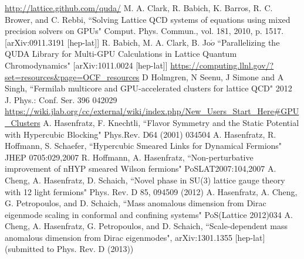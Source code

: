 \documentclass[11pt]{article}
\begin{document}
%
\begin{thebibliography}{99}
\url{http://lattice.github.com/quda/}
M. A. Clark, R. Babich, K. Barros, R. C. Brower, and C. Rebbi,
``Solving Lattice QCD systems of equations using mixed precision solvers on GPUs" Comput. Phys. Commun., vol. 181, 2010, p. 1517. [arXiv:0911.3191 
[hep-lat]]
R. Babich, M. A. Clark, B. Jo$\acute{o}$ ``Parallelizing the QUDA Library for Multi-GPU Calculations in Lattice Quantum Chromodynamics" [arXiv:1011.0024 
[hep-lat]]
\url{https://computing.llnl.gov/?set=resources&page=OCF_resources}
D Holmgren, N Seenu, J Simone and A Singh, ``Fermilab multicore and GPU-accelerated clusters for lattice QCD" 2012 J. Phys.: Conf. Ser. 396 042029
\url{https://wiki.jlab.org/cc/external/wiki/index.php/New_Users_Start_Here#GPU_Clusters}
A. Hasenfratz, F. Knechtli, ``Flavor Symmetry and the Static Potential with Hypercubic Blocking" Phys.Rev. D64 (2001) 034504
A. Hasenfratz, R. Hoffmann, S. Schaefer, ``Hypercubic Smeared Links for Dynamical Fermions" JHEP 0705:029,2007
R. Hoffmann, A. Hasenfratz, ``Non-perturbative improvement of nHYP smeared Wilson fermions" PoSLAT2007:104,2007
A. Cheng, A. Hasenfratz, D. Schaich, ``Novel phase in SU(3) lattice gauge theory with 12 light fermions" Phys. Rev. D 85, 094509 (2012) 
A. Hasenfratz, A. Cheng, G. Petropoulos, and D. Schaich, ``Mass anomalous dimension from Dirac eigenmode scaling in conformal and confining systems" PoS(Lattice 2012)034
A. Cheng, A. Hasenfratz, G. Petropoulos, and D. Schaich, ``Scale-dependent mass anomalous dimension from Dirac eigenmodes",  arXiv:1301.1355 [hep-lat] (submitted to Phys. Rev. D (2013))

\end{thebibliography}
\end{document}
